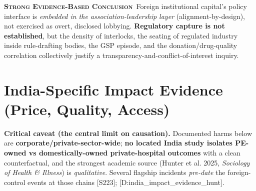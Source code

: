 \documentclass[11pt,a4paper]{article}
\newcommand{\SE}{\textcolor{secol}{\textsc{\textbf{Strong Evidence-Based Conclusion}}}}
\newcommand{\cs}[1]{\textnormal{[#1]}}
\begin{document}
\SE\ Foreign institutional capital's policy interface is \emph{embedded in the association-leadership layer} (alignment-by-design), not exercised as overt, disclosed lobbying. \textbf{Regulatory capture is not established}, but the density of interlocks, the seating of regulated industry inside rule-drafting bodies, the GSP episode, and the donation/drug-quality correlation collectively justify a transparency-and-conflict-of-interest inquiry.

\section{India-Specific Impact Evidence (Price, Quality, Access)}\label{sec:indiaimpact}
\textbf{Critical caveat (the central limit on causation).} Documented harms below are \textbf{corporate/private-sector-wide}; \textbf{no located India study isolates PE-owned vs domestically-owned private-hospital outcomes} with a clean counterfactual, and the strongest academic source (Hunter et al. 2025, \emph{Sociology of Health \& Illness}) is \emph{qualitative}. Several flagship incidents \emph{pre-date} the foreign-control events at those chains \cs{S223}; \cs{D:india\_impact\_evidence\_hunt}.
\end{document}
